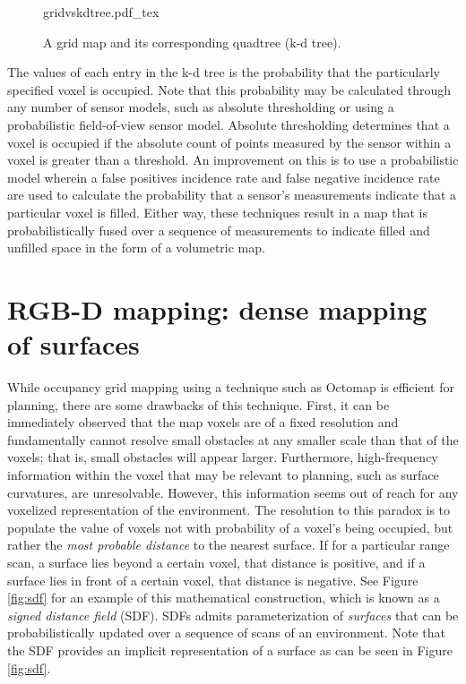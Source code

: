 \begin{figure}
    \centering
    \def\svgwidth{\textwidth}
    {gridvskdtree.pdf_tex}
    \caption{A grid map and its corresponding quadtree (k-d tree).\label{fig:gridvskdtree}}
\end{figure}

The values of each entry in the k-d tree is the probability that the particularly
specified voxel is occupied. Note that this probability may be calculated
through any number of sensor models, such as absolute thresholding or using a
probabilistic field-of-view sensor model. Absolute thresholding determines
that a voxel is occupied if the absolute count of points measured
by the sensor within a voxel is greater than a threshold. An improvement on this is
to use a probabilistic model wherein a false positives
incidence rate and false negative incidence rate are used to calculate the probability
that a sensor's measurements indicate that a particular voxel is filled. Either way,
these techniques result in a map that is probabilistically fused over a sequence of
measurements to indicate filled and unfilled space in the form of a volumetric map.


\section{RGB-D mapping: dense mapping of surfaces}
While occupancy grid mapping using a technique such as Octomap is efficient for
planning, there are some drawbacks of this technique. First, it can be immediately
observed that the map voxels are of a fixed resolution and fundamentally cannot
resolve small obstacles at any smaller scale than that of the voxels; that is, small
obstacles will appear larger. Furthermore, high-frequency information within the voxel
that may be relevant to planning, such as surface curvatures, are unresolvable.
However, this information seems out of reach for any voxelized representation of
the environment. The resolution to this paradox is to populate the value of voxels
not with probability of a voxel's being occupied, but rather the \emph{most probable distance}
to the nearest surface. If for a particular range scan, a surface lies beyond a certain voxel,
that distance is positive, and if a surface lies in front of a certain voxel,
that distance is negative. See Figure \ref{fig:sdf} for an example of this
mathematical construction, which is known as a \emph{signed distance field} (SDF).
SDFs admits parameterization of \emph{surfaces} that can be probabilistically updated
over a sequence of scans of an environment. Note that the SDF provides an implicit
representation of a surface as can be seen in Figure \ref{fig:sdf}.

